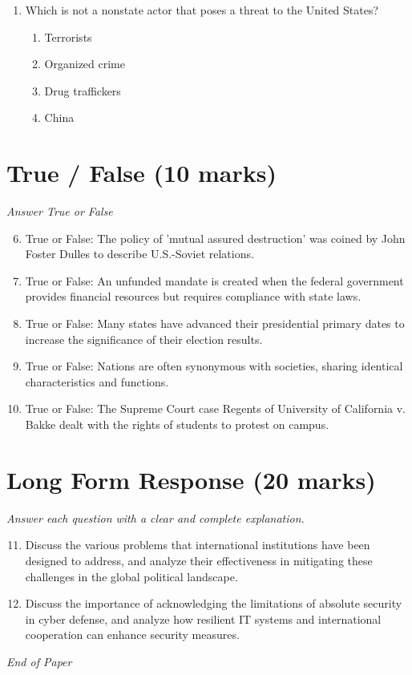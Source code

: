 \documentclass[12pt]{article}
\begin{document}
\begin{enumerate}[label=\arabic*.]
\begin{enumerate}[label=(\alph*)]
    \item Face-to-face meetings between state leaders
    \item The president consulting Congress on foreign policy issues
    \item Bilateral talks that do not involve a third-party negotiator
\end{enumerate}
\item Which is not a nonstate actor that poses a threat to the United States?
\begin{enumerate}[label=(\alph*)]
    \item Terrorists
    \item Organized crime
    \item Drug traffickers
    \item China
\end{enumerate}
\end{enumerate}

\section*{True / False (10 marks)}
\textit{Answer True or False}
\begin{enumerate}[label=\arabic*.]
\setcounter{enumi}{5}
\item True or False: The policy of 'mutual assured destruction' was coined by John Foster Dulles to describe U.S.-Soviet relations.
\item True or False: An unfunded mandate is created when the federal government provides financial resources but requires compliance with state laws.
\item True or False: Many states have advanced their presidential primary dates to increase the significance of their election results.
\item True or False: Nations are often synonymous with societies, sharing identical characteristics and functions.
\item True or False: The Supreme Court case Regents of University of California v. Bakke dealt with the rights of students to protest on campus.
\end{enumerate}

\section*{Long Form Response (20 marks)}
\textit{Answer each question with a clear and complete explanation.}
\begin{enumerate}[label=\arabic*.]
\setcounter{enumi}{10}
\item Discuss the various problems that international institutions have been designed to address, and analyze their effectiveness in mitigating these challenges in the global political landscape.
\item Discuss the importance of acknowledging the limitations of absolute security in cyber defense, and analyze how resilient IT systems and international cooperation can enhance security measures.
\end{enumerate}

\vfill
\noindent\textit{End of Paper}
\end{document}
